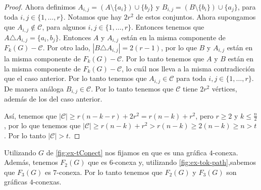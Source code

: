 \begin{proof}
Ahora definimos $A_{i,j} = (A\setminus \{a_i\}) \cup \{b_j\}$ y $B_{i,j} =
(B\setminus \{b_i\}) \cup \{a_j\}$, para toda $ i, j \in \{1, \dots, r\}$.
Notamos que hay $2r^2$ de estos conjuntos. Ahora supongamos que $A_{i,j} \notin
\mathcal{C}$, para algunos $ i, j \in \{1, \dots, r\}$. Entonces tenemos que $A
\triangle A_{i,j} = \{a_i, b_j\}$. Entonces $A$ y $A_{i,j}$ est\'an en la misma
componente de $F_k(G)- \mathcal{C}$. Por otro lado, $|B \triangle A_{i,j}| = 2
(r-1)$, por lo que $B$ y $A_{i,j}$ est\'an en la misma componente de $F_k(G) -
\mathcal{C}$. Por lo tanto tenemos que $A$ y $B$ est\'an en la misma componente
de $F_k(G)-\mathcal{C}$, lo cu\'al nos lleva a la misma contradicci\'on que el
caso anterior. Por lo tanto tenemos que $A_{i,j} \in \mathcal{C}$ para toda $i,
j \in \{1, \dots, r\}$. De manera an\'aloga $B_{i,j} \in \mathcal{C}$. Por lo
tanto tenemos que $\mathcal{C}$ tiene $2r^2$ v\'ertices, adem\'as de los del
caso anterior.

As\'i, tenemos que $|\mathcal{C}|\geq r(n-k-r)+2r^2 = r(n-k) + r^2$, pero $r
\geq 2$ y $k \leq \frac{n}{2}$, por lo que tenemos que $|\mathcal{C}| \geq
r(n-k)+r^2 > r(n-k) \geq 2(n-k) \geq n >t$. Por lo tanto $|\mathcal{C}|>t$.
\end{proof} 


Utilizando $G$ de \cref{fig:ex-tConect} nos fijamos en que es una gr\'afica
$4$-conexa. Adem\'as, tenemos $F_2(G)$ que es $6$-conexa y, utilizando
\cref{fig:ex-tok-path},sabemos que $F_3(G)$ es $7$-conexa. Por lo tanto tenemos
que $F_2(G)$ y $F_3(G)$ son gr\'aficas $4$-conexas.



